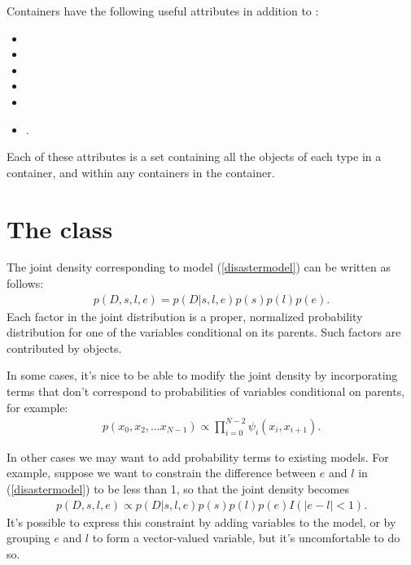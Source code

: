 Containers have the following useful attributes in addition to :
\begin{itemize}
    \item{}
    \item{}
    \item{}
    \item{}
    \item{}
    \item{}.
\end{itemize}
Each of these attributes is a set containing all the objects of each type in a container, and within any containers in the container.



\section[The Potential class]{The  class} \label{potential}



The joint density corresponding to model (\ref{disastermodel}) can be written as follows:
\begin{eqnarray*}
    p(D,s,l,e) = p(D|s,l,e) p(s) p(l) p(e).
\end{eqnarray*}
Each factor in the joint distribution is a proper, normalized probability distribution for one of the variables conditional on its parents. Such factors are contributed by  objects.

In some cases, it's nice to be able to modify the joint density by incorporating terms that don't correspond to probabilities of variables conditional on parents, for example:
\begin{eqnarray*}
    p(x_0, x_2, \ldots x_{N-1}) \propto \prod_{i=0}^{N-2} \psi_i(x_i, x_{i+1}).
\end{eqnarray*}


In other cases we may want to add probability terms to existing models. For example, suppose we want to constrain the difference between $e$ and $l$ in (\ref{disastermodel}) to be less than 1, so that the joint density becomes
\begin{eqnarray*}
    p(D,s,l,e) \propto p(D|s,l,e) p(s) p(l) p(e) I(|e-l|<1).
\end{eqnarray*}
It's possible to express this constraint by adding variables to the model, or by grouping $e$ and $l$ to form a vector-valued variable, but it's uncomfortable to do so.

